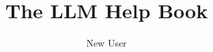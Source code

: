 \documentclass[12pt,a4paper,openany]{book}
\begin{document}
\frontmatter

\title{The LLM Help Book}
\author{New User}
\maketitle

\tableofcontents  
\listoffigures  
\listoftables

\mainmatter

\clearpage

\backmatter
\printbibliography
\end{document}
